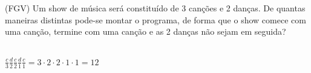 \begin{ex}
(FGV) Um show de música será constituído de 3 canções e 2 danças. De quantas maneiras distintas pode-se montar o programa, de forma que o show comece com uma canção, termine com uma canção e as 2 danças não sejam em seguida?
  \begin{sol}
   \phantom{A} \\
   $\frac{c}{3}\frac{d}{2}\frac{c}{2}\frac{d}{1}\frac{c}{1}=3\cdot2\cdot2\cdot1\cdot1= 12$
  \end{sol}
\end{ex}